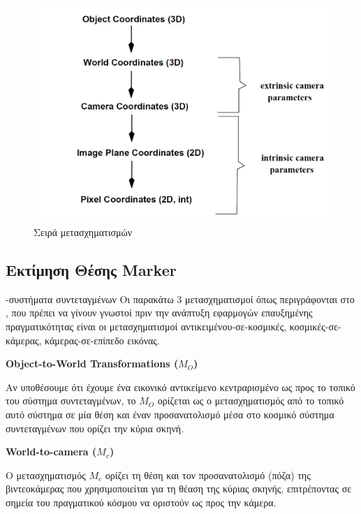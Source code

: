 \begin{figure}[H]
    \centering
    \includegraphics[scale=0.7, angle=0]{Files/Figures/coordinatesDiagram.png}
    \caption[Σειρά μετασχηματισμών]{ Σειρά μετασχηματισμών}
    \label{fig:coordinatesDiagram}
\end{figure}




\subsection{Εκτίμηση Θέσης Marker}



-συστήματα συντεταγμένων
Οι παρακάτω 3 μετασχηματισμοί όπως περιγράφονται στο \cite{Vallino1998}, που πρέπει να γίνουν γνωστοί πριν την ανάπτυξη εφαρμογών επαυξημένης πραγματικότητας είναι οι μετασχηματισμοί αντικειμένου-σε-κοσμικές, κοσμικές-σε-κάμερας, κάμερας-σε-επίπεδο εικόνας. 

\textbf{Object-to-World Transformations ($M_{O}$)}

Αν υποθέσουμε ότι έχουμε ένα εικονικό αντικείμενο κεντραρισμένο ως προς το τοπικό του σύστημα συντεταγμένων, το $M_{O}$ ορίζεται ως ο μετασχηματισμός από το τοπικό αυτό σύστημα σε μία θέση και έναν προσανατολισμό μέσα στο κοσμικό σύστημα συντεταγμένων που ορίζει την κύρια σκηνή.

\textbf{World-to-camera ($M_{c}$)}

Ο μετασχηματισμός $M_{c}$ ορίζει τη θέση και τον προσανατολισμό (πόζα) της βιντεοκάμερας που χρησιμοποιείται για τη θέαση της κύριας σκηνής, επιτρέποντας σε σημεία του πραγματικού κόσμου να οριστούν ως προς την κάμερα.

